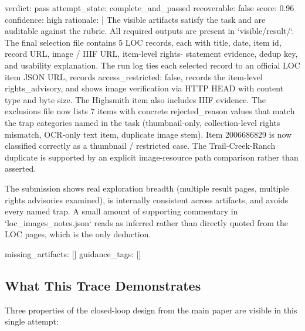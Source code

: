 \begin{clawcode}[title={Cycle 2 supervisor verdict (\texttt{score=0.96}, verdict \texttt{pass})},label={lst:case:verdict2}]
verdict: pass
attempt_state: complete_and_passed
recoverable: false
score: 0.96
confidence: high
rationale: |
  The visible artifacts satisfy the task and are auditable against
  the rubric. All required outputs are present in `visible/result/`.
  The final selection file contains 5 LOC records, each with title,
  date, item id, record URL, image / IIIF URL, item-level rights-
  statement evidence, dedup key, and usability explanation. The run
  log ties each selected record to an official LOC item JSON URL,
  records access_restricted: false, records the item-level
  rights_advisory, and shows image verification via HTTP HEAD with
  content type and byte size. The Highsmith item also includes IIIF
  evidence. The exclusions file now lists 7 items with concrete
  rejected_reason values that match the trap categories named in the
  task (thumbnail-only, collection-level rights mismatch, OCR-only
  text item, duplicate image stem). Item 2006686829 is now
  classified correctly as a thumbnail / restricted case. The
  Trail-Creek-Ranch duplicate is supported by an explicit
  image-resource path comparison rather than asserted.

  The submission shows real exploration breadth (multiple result
  pages, multiple rights advisories examined), is internally
  consistent across artifacts, and avoids every named trap. A small
  amount of supporting commentary in `loc_images_notes.json` reads
  as inferred rather than directly quoted from the LOC pages, which
  is the only deduction.

missing_artifacts: []
guidance_tags: []
\end{clawcode}

\subsection{What This Trace Demonstrates}\label{app:case-study:lessons}

Three properties of the closed-loop design from the main paper are
visible in this single attempt:

